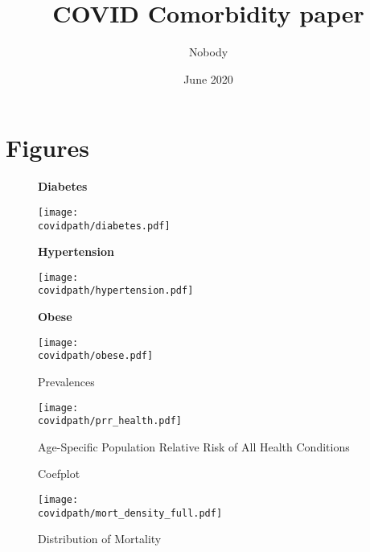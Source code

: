 \documentclass[12pt,letterpaper]{article}
\title{COVID Comorbidity paper} \author{Nobody}
\numberwithin{equation}{section}
\begin{document}
\date{June 2020}

\section{Figures}

\begin{figure}[H]
  \begin{center}
    \caption{Prevalences}
    
    \textbf{Diabetes}
    
    \texttt{[image: \\covidpath/diabetes.pdf]}

    \textbf{Hypertension}
    
    \texttt{[image: \\covidpath/hypertension.pdf]}

    \textbf{Obese}
    
    \texttt{[image: \\covidpath/obese.pdf]}
    
  \end{center}
\end{figure}

\begin{figure}[H]
  \begin{center}
    \caption{Age-Specific Population Relative Risk of All Health Conditions}
    \texttt{[image: \\covidpath/prr\_health.pdf]}
  \end{center}
\end{figure}

\begin{figure}[H]
  \begin{center}
    \caption{Coefplot}
  \end{center}
\end{figure}

\begin{figure}[H]
  \begin{center}
    \caption{Distribution of Mortality}
    \texttt{[image: \\covidpath/mort\_density\_full.pdf]}
  \end{center}
\end{figure}

\begin{table}[H]
  \begin{center}
    \caption{}
    
  \end{center}
\end{table}

\begin{table}[H]
  \begin{center}
    \caption{}
    
  \end{center}
\end{table}
\end{document}
